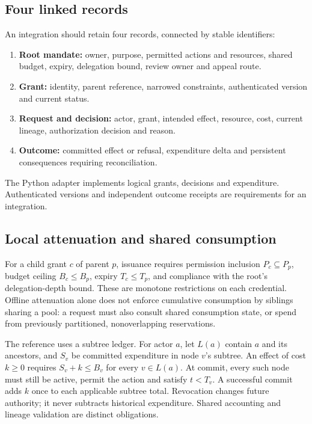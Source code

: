 \documentclass[11pt,letterpaper]{article}
\begin{document}
\subsection{Four linked records}
An integration should retain four records, connected by stable identifiers:
\begin{enumerate}
\item \textbf{Root mandate:} owner, purpose, permitted actions and resources, shared
budget, expiry, delegation bound, review owner and appeal route.
\item \textbf{Grant:} identity, parent reference, narrowed constraints, authenticated
version and current status.
\item \textbf{Request and decision:} actor, grant, intended effect, resource, cost,
current lineage, authorization decision and reason.
\item \textbf{Outcome:} committed effect or refusal, expenditure delta and persistent
consequences requiring reconciliation.
\end{enumerate}
The Python adapter implements logical grants, decisions and expenditure. Authenticated
versions and independent outcome receipts are requirements for an integration.

\subsection{Local attenuation and shared consumption}
For a child grant $c$ of parent $p$, issuance requires permission inclusion
$P_c\subseteq P_p$, budget ceiling $B_c\leq B_p$, expiry $T_c\leq T_p$, and compliance
with the root's delegation-depth bound. These are monotone restrictions on each
credential. Offline attenuation alone does not enforce cumulative consumption by
siblings sharing a pool: a request must also consult shared consumption state, or
spend from previously partitioned, nonoverlapping reservations.

The reference uses a subtree ledger. For actor $a$, let $L(a)$ contain $a$ and its
ancestors, and $S_v$ be committed expenditure in node $v$'s subtree. An effect of
cost $k\geq0$ requires $S_v+k\leq B_v$ for every $v\in L(a)$. At commit, every such
node must still be active, permit the action and satisfy $t<T_v$. A successful
commit adds $k$ once to each applicable subtree total. Revocation changes future
authority; it never subtracts historical expenditure. Shared accounting and lineage
validation are distinct obligations.
\end{document}
